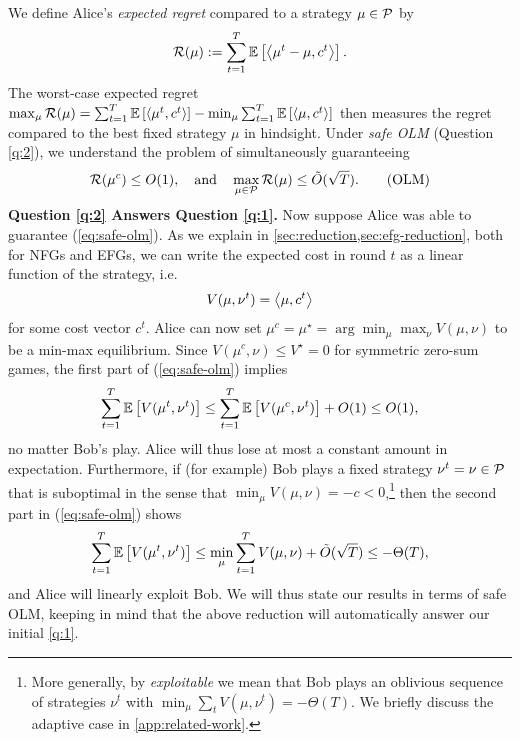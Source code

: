 \documentclass[11pt]{article}
\begin{document}
We define Alice's \emph{expected regret} compared to a strategy $\mu\in\mathcal{P}$ by
\begin{align*}
    \mathcal{R}(\mu) := \sum_{t=1}^T \mathbb{E}\left[ \left\langle \mu^t-\mu, c^t \right\rangle \right].
\end{align*}
The worst-case expected regret $\max_{\mu} \mathcal{R}(\mu)=\sum_{t=1}^T \mathbb{E}\left[ \left\langle \mu^t, c^t \right\rangle \right]-\min_{\mu}\sum_{t=1}^T \mathbb{E}\left[ \left\langle \mu, c^t \right\rangle \right]$ then measures the regret compared to the best fixed strategy $\mu$ in hindsight. Under \emph{safe OLM} (Question \ref{q:2}), we understand the problem of simultaneously guaranteeing 
\begin{align}
    \mathcal{R}(\mu^c) \leq O(1), \quad\text{and}\quad \max_{\mu\in\mathcal{P}}\mathcal{R}(\mu)\leq \tilde{O}(\sqrt{T}). \tag{OLM}\label{eq:safe-olm}
\end{align}
\textbf{Question \ref{q:2} Answers Question \ref{q:1}.} Now suppose Alice was able to guarantee (\ref{eq:safe-olm}). As we explain in \cref{sec:reduction,sec:efg-reduction}, both for NFGs and EFGs, we can write the expected cost in round $t$ as a linear function of the strategy, i.e.
\begin{align*}
    V(\mu,\nu^t)=\left\langle \mu, c^t \right\rangle
\end{align*}
for some cost vector $c^t$. Alice can now set $\mu^c=\mu^\star=\arg\min_{\mu}\max_{\nu} V(\mu,\nu)$ to be a min-max equilibrium. Since $V(\mu^c,\nu)\leq V^\star=0$ for symmetric zero-sum games, the first part of (\ref{eq:safe-olm}) implies
\begin{align*}
    \sum_{t=1}^T \mathbb{E}\left[ V(\mu^t,\nu^t) \right] \leq \sum_{t=1}^T \mathbb{E}\left[ V(\mu^c,\nu^t) \right] + O(1) \leq O(1),
\end{align*}
no matter Bob's play. Alice will thus lose at most a constant amount in expectation. Furthermore, if (for example) Bob plays a fixed strategy $\nu^t=\nu\in\mathcal{P}$ that is suboptimal in the sense that $\min_{\mu}V(\mu,\nu) = -c < 0$,\footnote{More generally, by \emph{exploitable} we mean that Bob plays an oblivious sequence of strategies $\nu^t$ with $\min_{\mu} \sum_t V(\mu,\nu^t) = -\Theta(T)$. We briefly discuss the adaptive case in \cref{app:related-work}.} then the second part in (\ref{eq:safe-olm}) shows
\begin{align*}
    \sum_{t=1}^T \mathbb{E}\left[ V(\mu^t,\nu^t) \right] \leq \min_{\mu} \sum_{t=1}^T V(\mu,\nu) + \tilde{O}(\sqrt{T}) \leq -\Theta(T),
\end{align*}
and Alice will linearly exploit Bob. We will thus state our results in terms of safe OLM, keeping in mind that the above reduction will automatically answer our initial \cref{q:1}.
\end{document}
